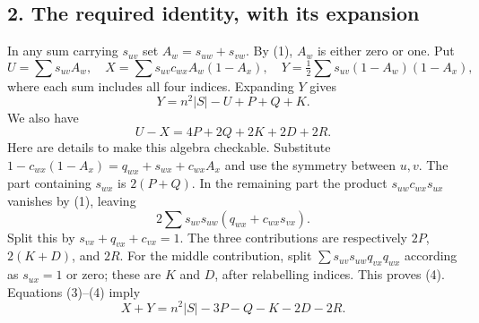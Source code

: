 \subsection*{2. The required identity, with its expansion}
In any sum carrying $s_{uv}$ set $A_w=s_{uw}+s_{vw}$. By (1), $A_w$ is either zero or one. Put
\[
 U=\sum s_{uv}A_w,\quad
 X=\sum s_{uv}c_{wx}A_w(1-A_x),\quad
 Y=\tfrac12\sum s_{uv}(1-A_w)(1-A_x),
\]
where each sum includes all four indices. Expanding $Y$ gives
\[
 Y=n^2|S|-U+P+Q+K. \tag{3}
\]
We also have
\[
 U-X=4P+2Q+2K+2D+2R. \tag{4}
\]
Here are details to make this algebra checkable. Substitute
$1-c_{wx}(1-A_x)=q_{wx}+s_{wx}+c_{wx}A_x$ and use the symmetry between $u,v$. The part containing $s_{wx}$ is $2(P+Q)$. In the remaining part the product $s_{uw}c_{wx}s_{ux}$ vanishes by (1), leaving
\[
 2\sum s_{uv}s_{uw}(q_{wx}+c_{wx}s_{vx}).
\]
Split this by $s_{vx}+q_{vx}+c_{vx}=1$. The three contributions are respectively $2P$, $2(K+D)$, and $2R$. For the middle contribution, split $\sum s_{uv}s_{uw}q_{vx}q_{wx}$ according as $s_{ux}=1$ or zero; these are $K$ and $D$, after relabelling indices. This proves (4). Equations (3)--(4) imply
\[
 X+Y=n^2|S|-3P-Q-K-2D-2R. \tag{5}
\]

